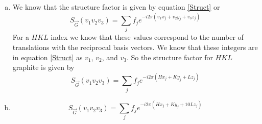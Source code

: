 \documentclass[11pt]{article}
\numberwithin{equation}{section}
\begin{document}
\begin{enumerate}[(a)]
\begin{align*}
\begin{array}{ccc}
			\hat{x}			&\hat{y}	&\hat{z}\\
			0			&0		&c\\
			-\dfrac{\sqrt{3}a}{2}	&\dfrac{a}{2}	&0
			\end{array}\right)\\
&= -\frac{ac}{2}\hat{x} +\frac{\sqrt{3}ac}{2}\hat{y}\\
\end{align*}
for equation \ref{recip2} which we now can say is
\begin{align*}
\vec{b_2} &= 2\pi\frac{\vec{a_3}\times\vec{a_1}}{\vec{a_1}\cdot(\vec{a_2}\times\vec{a_3})}\\
&= -\frac{4\pi}{\sqrt{3}a^2c}\frac{ac}{2}\hat{x} + \frac{4\pi}{\sqrt{3}a^2c}\frac{\sqrt{3}ac}{2}\hat{y}\\
&= -\frac{2\pi}{\sqrt{3}a}\hat{x} + \frac{2\pi}{a}\hat{y}
\end{align*}
And finally we calculate
\begin{align*}
\vec{a_1}\times\vec{a_2} &= \det\left(\begin{array}{ccc}
			\hat{x}			&\hat{y}	&\hat{z}\\
			-\dfrac{\sqrt{3}a}{2}	&\dfrac{a}{2}	&0\\
			\dfrac{\sqrt{3}a}{2}	&\dfrac{a}{2}	&0
			\end{array}\right)\\
&= \left(-\frac{\sqrt{3}a^2}{4}-\frac{\sqrt{3}a^2}{4}\right)\hat{z}\\
&= -\frac{\sqrt{3}a^2}{2}\hat{z}
\end{align*}
So equation \ref{recip3} gives us
\begin{align*}
\vec{b_3} &= 2\pi\frac{\vec{a_1}\times\vec{a_2}}{\vec{a_1}\cdot(\vec{a_2}\times\vec{a_3})}\\
&= -\frac{4\pi}{\sqrt{3}a^2c}\frac{\sqrt{3}a^2}{2}\hat{z}\\
&= -\frac{2\pi}{c}\hat{z}
\end{align*}
So we can say that the basis vectors for the reciprocal lattice are
\begin{align*}
\vec{b_1} &= \frac{2\pi}{\sqrt{3}a}\hat{x} - \frac{2\pi}{a}\hat{y}\\
\vec{b_2} &= -\frac{2\pi}{\sqrt{3}a}\hat{x} + \frac{2\pi}{a}\hat{y}\\
\vec{b_3} &= -\frac{2\pi}{c}\hat{z}
\end{align*}

\item
We know that the structure factor is given by equation \ref{Struct} or
$$ S_{\vec{G}}(v_1v_2v_3) = \sum_{j}f_je^{-i2\pi(v_1x_j+v_2y_j+v_3z_j)}$$
For a $HKL$ index we know that these values correspond to the number of translations with the reciprocal basis vectors. We know that these integers are in equation \ref{Struct} as $v_1$, $v_2$, and $v_3$. So the structure factor for $HKL$ graphite is given by
$$ S_{\vec{G}}(v_1v_2v_3) = \sum_{j}f_je^{-i2\pi(Hx_j+Ky_j+Lz_j)}$$

\item
$$ S_{\vec{G}}(v_1v_2v_3) = \sum_{j}f_je^{-i2\pi(Hx_j+Ky_j+10Lz_j)}$$
\end{enumerate}
\end{document}
